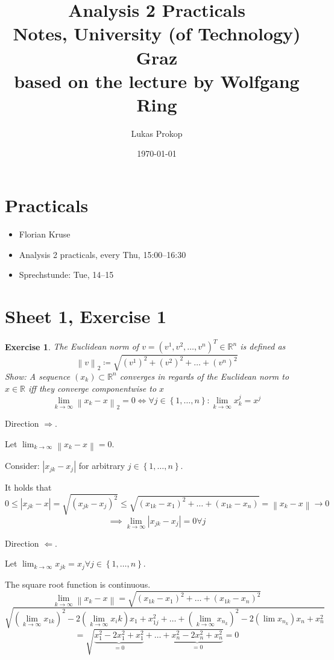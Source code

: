 \documentclass{article}
\title{
  Analysis 2 Practicals \\
  \large{Notes, University (of Technology) Graz} \\
  based on the lecture by Wolfgang Ring
}
\date{\today}
\author{Lukas Prokop}
\newtheorem{ex}{Exercise} %
\newcommand{\set}[1]{\left\{#1\right\}}
\newcommand{\norm}[1]{\left\|#1\right\|}
\newcommand{\card}[1]{\left|#1\right|}
\begin{document}
\maketitle
\tableofcontents

\section{Practicals}
\begin{itemize}
  \item Florian Kruse
  \item Analysis 2 practicals, every Thu, 15:00--16:30
  \item Sprechstunde: Tue, 14--15
\end{itemize}

\section{Sheet 1, Exercise 1}

\begin{ex}
  The Euclidean norm of $v = (v^1, v^2, \dots, v^n)^T \in \mathbb R^n$ is defined as
  \[ \norm{v}_2 \coloneqq \sqrt{(v^1)^2 + (v^2)^2 + \ldots + (v^n)^2} \]
  Show: A sequence $(x_k) \subset \mathbb R^n$ converges in regards of the Euclidean norm to $x \in \mathbb R$ iff they converge componentwise to $x$
  \[ \lim_{k\to\infty} \norm{x_k - x}_2 = 0 \iff \forall j \in \set{1,\dots,n}: \lim_{k\to\infty} x_k^j = x^j \]
\end{ex}

Direction $\Rightarrow$.

Let $\lim_{k \to \infty} \norm{x_k - x} = 0$.

Consider: $\card{x_{jk} - x_j}$ for arbitrary $j \in \set{1,\dots,n}$.

It holds that
\[ 0 \leq \card{x_{jk} - x} = \sqrt{(x_{jk} - x_j)^2} \leq \sqrt{(x_{1k} - x_1)^2 + \dots + (x_{1k} - x_n)} = \norm{x_k - x} \to 0 \]
\[ \implies \lim_{k\to\infty} \card{x_{jk} - x_j} = 0 \forall j \]

Direction $\Leftarrow$.

Let $\lim_{k\to\infty} x_{jk} = x_j \forall j \in \set{1,\dots,n}$.

The square root function is continuous.
\[ \lim_{k\to\infty} \norm{x_k - x} = \sqrt{(x_{1k} - x_1)^2 + \dots + (x_{1k} - x_n)^2} \]
\[ \sqrt{(\lim_{k\to\infty} x_{1k})^2 - 2 (\lim_{k\to\infty} x_i k) x_1 + x_{1j}^2 + \dots + (\lim_{k\to\infty} x_{n_k})^2 - 2 (\lim{x_{n_k}}) x_n + x_n^2} \]
\[ = \sqrt{\underbrace{x_1^2 - 2x_1^2 + x_1^2}_{= 0} + \dots + \underbrace{x_n^2 - 2x_n^2 + x_n^2}_{= 0}} = 0 \]
\end{document}

